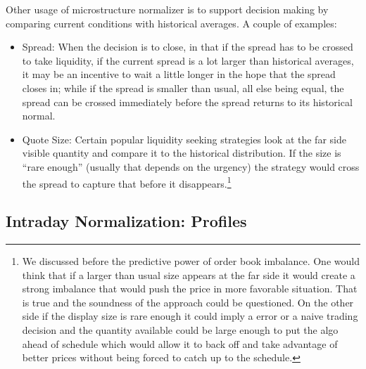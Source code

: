 Other usage of microstructure normalizer is to support decision making by comparing current conditions with historical averages. A couple of examples:
        \begin{itemize}
        \item Spread: When the decision is to close, in that if the spread has to be crossed to take liquidity, if the current spread is a lot larger than historical averages, it may be an incentive to wait a little longer in the hope that the spread closes in; while if the spread is smaller than usual, all else being equal, the spread can be crossed immediately before the spread returns to its historical normal.
        \item Quote Size: Certain popular liquidity seeking strategies look at the far side visible quantity and compare it to the historical distribution. If the size is ``rare enough'' (usually that depends on the urgency) the strategy would  cross the spread to capture that before it disappears.\footnote{We discussed before the predictive power of order book imbalance. One would think that if a larger than usual size appears at the far side it would create a strong imbalance that would push the price in more favorable situation. That is true and the soundness of the approach could be questioned. On the other side if the display size is rare enough it could imply a error or a naive trading decision and the quantity available could be large enough to put the algo ahead of schedule which would allow it to back off and take advantage of better prices without being forced to catch up to the schedule.}
        \end{itemize}



\subsection{Intraday Normalization: Profiles \label{s:profiles}}


